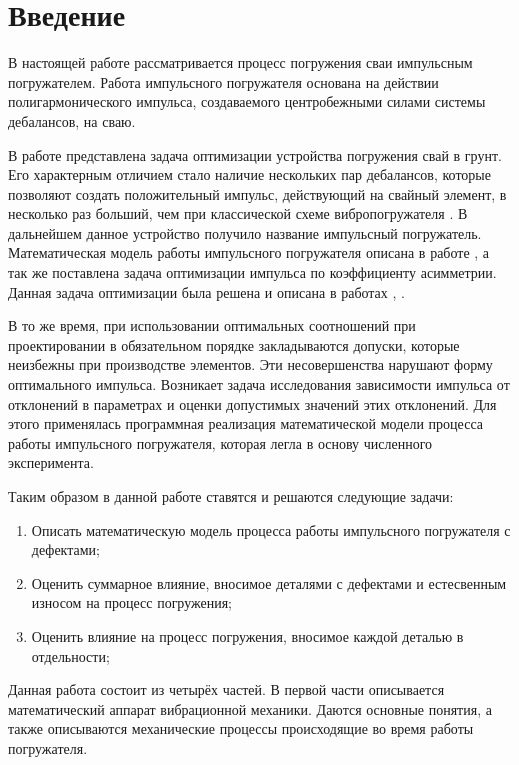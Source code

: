 \section*{Введение}

В настоящей работе рассматривается процесс погружения сваи импульсным погружателем. 
Работа импульсного погружателя основана на действии полигармонического импульса,
создаваемого центробежными силами системы дебалансов, на сваю.

В работе \cite{ermolenko} представлена задача оптимизации устройства погружения свай в грунт. Его характерным отличием стало наличие
нескольких пар дебалансов, которые позволяют создать положительный импульс, действующий на свайный элемент, в несколько раз больший,
чем при классической схеме вибропогружателя \cite{ermolenko_patent}. В дальнейшем данное устройство получило название импульсный погружатель.
Математическая модель работы импульсного погружателя описана в работе \cite{ermolenko_kostin}, а так же поставлена задача оптимизации импульса по
коэффициенту асимметрии. Данная задача оптимизации была решена и описана в работах \cite{kostin_va}, \cite{ermolenko_kostin}.

В то же время, при использовании оптимальных соотношений при проектировании в обязательном порядке закладываются допуски,
которые неизбежны при производстве элементов. Эти несовершенства нарушают форму оптимального импульса. Возникает задача исследования
зависимости импульса от отклонений в параметрах и оценки допустимых значений этих отклонений. Для этого применялась программная реализация
математической модели процесса работы импульсного погружателя, которая легла в основу численного эксперимента.

Таким образом в данной работе ставятся и решаются следующие задачи:
\begin{enumerate}
    \item Описать математическую модель процесса работы импульсного погружателя с дефектами;
    \item Оценить суммарное влияние, вносимое деталями с дефектами и естесвенным износом на процесс погружения;
    \item Оценить влияние на процесс погружения, вносимое каждой деталью в отдельности;
\end{enumerate}

Данная работа состоит из четырёх частей. В первой части описывается математический аппарат вибрационной механики.
Даются основные понятия, а также описываются механические процессы происходящие во время работы погружателя.

